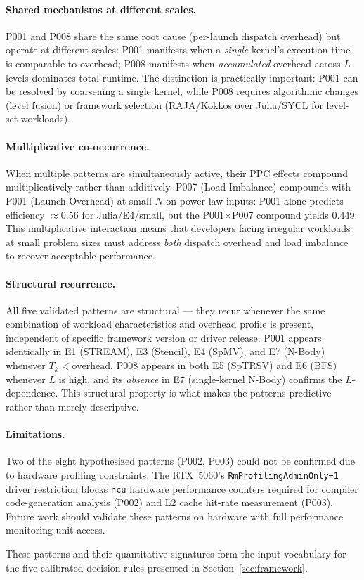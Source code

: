 \paragraph{Shared mechanisms at different scales.}
P001 and P008 share the same root cause (per-launch dispatch overhead) but
operate at different scales: P001 manifests when a \emph{single} kernel's
execution time is comparable to overhead; P008 manifests when
\emph{accumulated} overhead across $L$ levels dominates total runtime. The
distinction is practically important: P001 can be resolved by coarsening a
single kernel, while P008 requires algorithmic changes (level fusion) or
framework selection (RAJA/Kokkos over Julia/SYCL for level-set workloads).

\paragraph{Multiplicative co-occurrence.}
When multiple patterns are simultaneously active, their PPC effects compound
multiplicatively rather than additively. P007 (Load Imbalance) compounds with
P001 (Launch Overhead) at small $N$ on power-law inputs: P001 alone predicts
efficiency $\approx 0.56$ for Julia/E4/small, but the P001$\times$P007
compound yields 0.449. This multiplicative interaction means that developers
facing irregular workloads at small problem sizes must address \emph{both}
dispatch overhead and load imbalance to recover acceptable performance.

\paragraph{Structural recurrence.}
All five validated patterns are structural --- they recur whenever the same
combination of workload characteristics and overhead profile is present,
independent of specific framework version or driver release. P001 appears
identically in E1 (STREAM), E3 (Stencil), E4 (SpMV), and E7 (N-Body)
whenever $T_k < \text{overhead}$. P008 appears in both E5 (SpTRSV) and E6
(BFS) whenever $L$ is high, and its \emph{absence} in E7 (single-kernel
N-Body) confirms the $L$-dependence. This structural property is what makes
the patterns predictive rather than merely descriptive.

\paragraph{Limitations.}
Two of the eight hypothesized patterns (P002, P003) could not be confirmed
due to hardware profiling constraints. The RTX~5060's
\texttt{RmProfilingAdminOnly=1} driver restriction blocks \texttt{ncu}
hardware performance counters required for compiler code-generation analysis
(P002) and L2 cache hit-rate measurement (P003). Future work should validate
these patterns on hardware with full performance monitoring unit access.

\medskip
\noindent These patterns and their quantitative signatures form the input
vocabulary for the five calibrated decision rules presented in
Section~\ref{sec:framework}.

